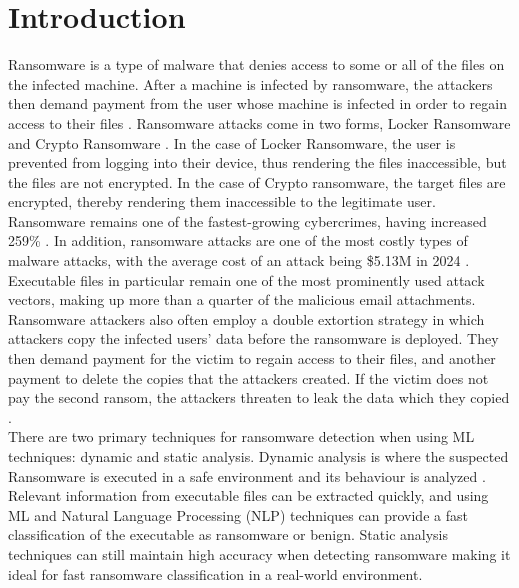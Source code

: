 \documentclass[conference]{IEEEtran}
\begin{document}
\section{Introduction}
Ransomware is a type of malware that denies access to some or all of the files on the infected machine. After a machine is infected by ransomware, the attackers then demand payment from the user whose machine is infected in order to regain access to their files \cite{rans_effects}. Ransomware attacks come in two forms, Locker Ransomware and Crypto Ransomware \cite{kaspersky_2022}. In the case of Locker Ransomware, the user is prevented from logging into their device, thus rendering the files inaccessible, but the files are not encrypted. In the case of Crypto ransomware, the target files are encrypted, thereby rendering them inaccessible to the legitimate user. \\

Ransomware remains one of the fastest-growing cybercrimes, having increased 259\%  \cite{rans_growth}. In addition, ransomware attacks are one of the most costly types of malware attacks, with the average cost of an attack being \$5.13M in 2024 \cite{rans_cost}. Executable files in particular remain one of the most prominently used attack vectors, making up more than a quarter of the malicious email attachments. Ransomware attackers also often employ a double extortion strategy in which attackers copy the infected users' data before the ransomware is deployed. They then demand payment for the victim to regain access to their files, and another payment to delete the copies that the attackers created. If the victim does not pay the second ransom, the attackers threaten to leak the data which they copied \cite{double_extortion}. \\

There are two primary techniques for ransomware detection when using ML techniques: dynamic and static analysis. Dynamic analysis is where the suspected Ransomware is executed in a safe environment and its behaviour is analyzed \cite{Raghuraman2020} \cite{ElMerabet2019} \cite{dfrRansomware}. Relevant information from executable files can be extracted quickly, and using ML and Natural Language Processing (NLP) techniques can provide a fast classification of the executable as ransomware or benign. Static analysis techniques can still maintain high accuracy when detecting ransomware making it ideal for fast ransomware classification in a real-world environment.
\vspace{-0.5ex}
\end{document}
